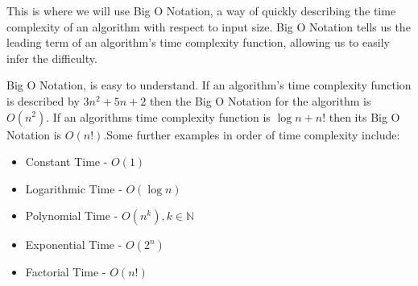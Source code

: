 \documentclass[twoside,10pt]{article}
\begin{document}
This is where we will use Big O Notation, a way of quickly describing the time complexity of an algorithm with respect to input size. Big O Notation tells us the leading term of an algorithm's time complexity function, allowing us to easily infer the difficulty.

Big O Notation, is easy to understand. If an algorithm's time complexity function is described by $3n^2+5n+2$ then the Big O Notation for the algorithm is $O(n^2)$. If an algorithms time complexity function is $\log{n}+n!$ then its Big O Notation is $O(n!)$.Some further examples in order of time complexity include:
\begin{itemize}
    \item Constant Time - $O(1)$
    \item Logarithmic Time - $O(\log{n})$
    \item Polynomial Time - $O(n^k),k\in\mathbb{N}$
    \item Exponential Time - $O(2^n)$
    \item Factorial Time - $O(n!)$
\end{itemize}
\end{document}
